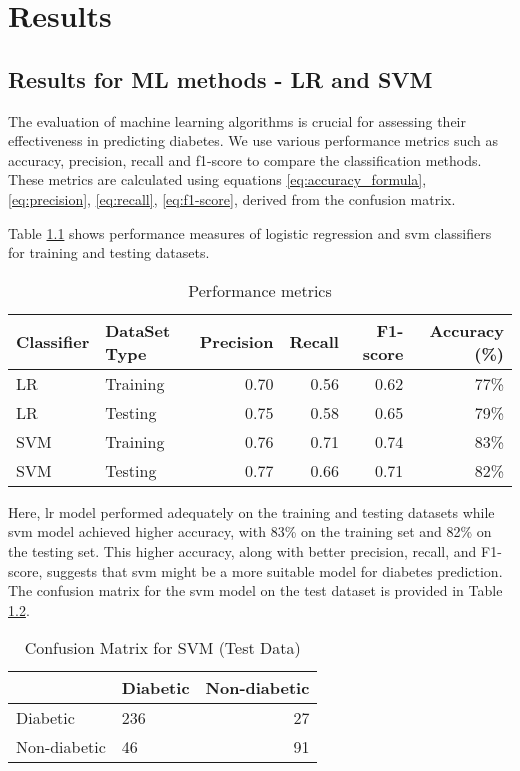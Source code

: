 \chapter{Results}
\label{ch:results}
\section{Results for ML methods - LR and SVM}
The evaluation of machine learning algorithms is crucial for assessing their effectiveness in predicting diabetes. We use various performance metrics such as accuracy, precision, recall and f1-score to compare the classification methods. These metrics are calculated using equations \ref{eq:accuracy_formula}, \ref{eq:precision}, \ref{eq:recall}, \ref{eq:f1-score}, derived from the confusion matrix.

Table \ref{tab:p_metrics} shows performance measures of logistic regression and svm classifiers for training and testing datasets.

\begin{table}[h!]
    \centering
    \caption{Performance metrics}
    \label{tab:p_metrics}
    \begin{tabular}{llrrrr}     
        \toprule
        Classifier  &   DataSet Type &   Precision   &   Recall  &   F1-score    &   Accuracy (\%) \\
        \midrule
        LR  &   Training    &   0.70   &   0.56   &   0.62    &   77\%   \\
        LR  &   Testing &   0.75   &   0.58   &   0.65    &   79\%   \\
        SVM  &   Training    &   0.76   &   0.71   &   0.74    &   83\%   \\
        SVM  &   Testing &   0.77   &   0.66   &   0.71    &   82\%   \\
        \bottomrule
    \end{tabular}
\end{table}

Here, lr model performed adequately on the training and testing datasets while svm model achieved higher accuracy, with 83\% on the training set and 82\% on the testing set. This higher accuracy, along with better precision, recall, and F1-score, suggests that svm might be a more suitable model for diabetes prediction. The confusion matrix for the svm model on the test dataset is provided in Table \ref{tab:conf_matrix}.

\begin{table}[h!]
    \centering
    \caption{Confusion Matrix for SVM (Test Data)}
    \label{tab:conf_matrix}
    \begin{tabular}{llr}     
        \toprule
        & Diabetic  &   Non-diabetic \\
        \midrule
        Diabetic &  236  &   27   \\
        Non-diabetic &  46    &   91  \\
        \bottomrule
    \end{tabular}
\end{table}


